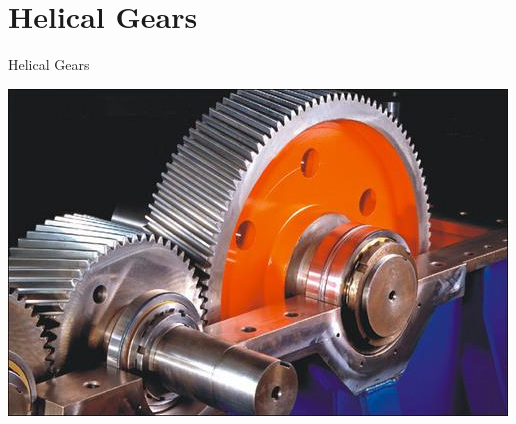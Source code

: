\documentclass[10pt, svgnames]{beamer}
\begin{document}
\section{Helical Gears}
\label{helical-gears}
\begin{frame}[label={sec:org49be712}]{Helical Gears}
\begin{center}
\includegraphics[width=.9\linewidth]{pictures/helical-gearbox.jpg}
\end{center}
\end{frame}
\end{document}
